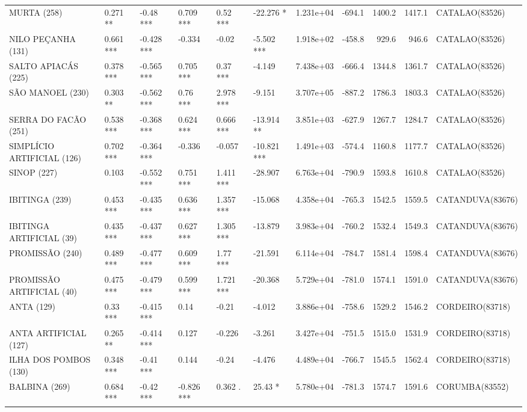 \documentclass[12pt,oneside]{book}\usepackage[]{graphicx}\usepackage[]{color}
\newenvironment{knitrout}{}{} %
\theoremstyle{definition} %
\begin{document}
\begin{knitrout}
\begin{landscape}
\begin{table}
{\begin{tabular}[t]{llllllrrrrl}
\addlinespace
MURTA (258) & 0.271 ** & -0.48 *** & 0.709 *** & 0.52 *** & -22.276 * & 1.231e+04 & -694.1 & 1400.2 & 1417.1 & CATALAO(83526)\\
\rowcolor{gray!6}  NILO PEÇANHA (131) & 0.661 *** & -0.428 *** & -0.334 & -0.02 & -5.502 *** & 1.918e+02 & -458.8 & 929.6 & 946.6 & CATALAO(83526)\\
SALTO APIACÁS (225) & 0.378 *** & -0.565 *** & 0.705 *** & 0.37 *** & -4.149 & 7.438e+03 & -666.4 & 1344.8 & 1361.7 & CATALAO(83526)\\
\rowcolor{gray!6}  SÃO MANOEL (230) & 0.303 ** & -0.562 *** & 0.76 *** & 2.978 *** & -9.151 & 3.707e+05 & -887.2 & 1786.3 & 1803.3 & CATALAO(83526)\\
SERRA DO FACÃO (251) & 0.538 *** & -0.368 *** & 0.624 *** & 0.666 *** & -13.914 ** & 3.851e+03 & -627.9 & 1267.7 & 1284.7 & CATALAO(83526)\\
\addlinespace
\rowcolor{gray!6}  SIMPLÍCIO ARTIFICIAL (126) & 0.702 *** & -0.364 *** & -0.336 & -0.057 & -10.821 *** & 1.491e+03 & -574.4 & 1160.8 & 1177.7 & CATALAO(83526)\\
SINOP (227) & 0.103 & -0.552 *** & 0.751 *** & 1.411 *** & -28.907 & 6.763e+04 & -790.9 & 1593.8 & 1610.8 & CATALAO(83526)\\
\rowcolor{gray!6}  IBITINGA (239) & 0.453 *** & -0.435 *** & 0.636 *** & 1.357 *** & -15.068 & 4.358e+04 & -765.3 & 1542.5 & 1559.5 & CATANDUVA(83676)\\
IBITINGA ARTIFICIAL (39) & 0.435 *** & -0.437 *** & 0.627 *** & 1.305 *** & -13.879 & 3.983e+04 & -760.2 & 1532.4 & 1549.3 & CATANDUVA(83676)\\
\rowcolor{gray!6}  PROMISSÃO (240) & 0.489 *** & -0.477 *** & 0.609 *** & 1.77 *** & -21.591 & 6.114e+04 & -784.7 & 1581.4 & 1598.4 & CATANDUVA(83676)\\
\addlinespace
PROMISSÃO ARTIFICIAL (40) & 0.475 *** & -0.479 *** & 0.599 *** & 1.721 *** & -20.368 & 5.729e+04 & -781.0 & 1574.1 & 1591.0 & CATANDUVA(83676)\\
\rowcolor{gray!6}  ANTA (129) & 0.33 *** & -0.415 *** & 0.14 & -0.21 & -4.012 & 3.886e+04 & -758.6 & 1529.2 & 1546.2 & CORDEIRO(83718)\\
ANTA ARTIFICIAL (127) & 0.265 ** & -0.414 *** & 0.127 & -0.226 & -3.261 & 3.427e+04 & -751.5 & 1515.0 & 1531.9 & CORDEIRO(83718)\\
\rowcolor{gray!6}  ILHA DOS POMBOS (130) & 0.348 *** & -0.41 *** & 0.144 & -0.24 & -4.476 & 4.489e+04 & -766.7 & 1545.5 & 1562.4 & CORDEIRO(83718)\\
BALBINA (269) & 0.684 *** & -0.42 *** & -0.826 *** & 0.362 . & 25.43 * & 5.780e+04 & -781.3 & 1574.7 & 1591.6 & CORUMBA(83552)\\
\bottomrule
\end{tabular}}
\end{table}
\end{landscape}


\end{knitrout}
\end{document}
